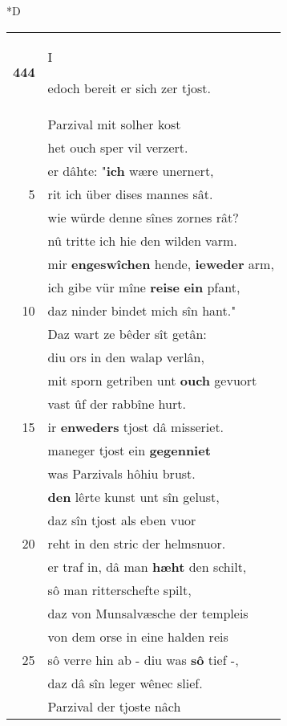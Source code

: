 \documentclass[8pt,a4paper,notitlepage]{article}
\begin{document}
\begin{table}[ht]
\begin{minipage}[t]{0.5\linewidth}
\small
\begin{center}*D
\end{center}
\begin{tabular}{rl}
\textbf{444} & \begin{large}I\end{large}edoch bereit er sich zer tjost.\\ 
 & Parzival mit solher kost\\ 
 & het ouch sper vil verzert.\\ 
 & er dâhte: "\textbf{ich} wære unernert,\\ 
5 & rit ich über dises mannes sât.\\ 
 & wie würde denne sînes zornes rât?\\ 
 & nû tritte ich hie den wilden varm.\\ 
 & mir \textbf{engeswîchen} hende, \textbf{ieweder} arm,\\ 
 & ich gibe vür mîne \textbf{reise} \textbf{ein} pfant,\\ 
10 & daz ninder bindet mich sîn hant."\\ 
 & Daz wart ze bêder sît getân:\\ 
 & diu ors in den walap verlân,\\ 
 & mit sporn getriben unt \textbf{ouch} gevuort\\ 
 & vast ûf der rabbîne hurt.\\ 
15 & ir \textbf{enweders} tjost dâ misseriet.\\ 
 & maneger tjost ein \textbf{gegenniet}\\ 
 & was Parzivals hôhiu brust.\\ 
 & \textbf{den} lêrte kunst unt sîn gelust,\\ 
 & daz sîn tjost als eben vuor\\ 
20 & reht in den stric der helmsnuor.\\ 
 & er traf in, dâ man \textbf{hæht} den schilt,\\ 
 & sô man ritterschefte spilt,\\ 
 & daz von Munsalvæsche der templeis\\ 
 & von dem orse in eine halden reis\\ 
25 & sô verre hin ab - diu was \textbf{sô} tief -,\\ 
 & daz dâ sîn leger wênec slief.\\ 
 & Parzival der tjoste nâch\\ 

\end{tabular}
\end{minipage}
\end{table}
\end{document}
